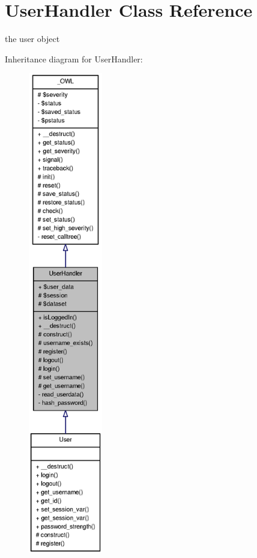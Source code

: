 \section{UserHandler Class Reference}
\label{classUserHandler}


the user object  




Inheritance diagram for UserHandler:
\nopagebreak
\begin{figure}[H]
\begin{center}
\leavevmode
\includegraphics[height=600pt]{classUserHandler__inherit__graph}
\end{center}
\end{figure}


